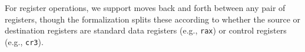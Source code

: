 For register operations, we support moves back and forth between any pair of registers, though the \coq formalization splits these according to whether
the source or destination registers are standard data registers (e.g., \lstinline|rax|) or control registers (e.g., \lstinline|cr3|).
%

